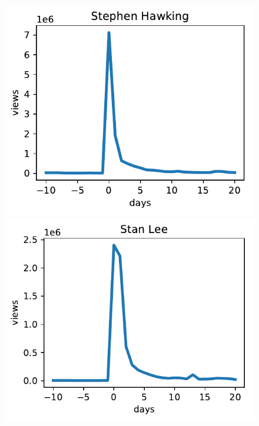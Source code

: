 \documentclass[conference]{IEEEtran}
\begin{document}
\begin{figure}[!htb] \label{views}
  \includegraphics[width=\linewidth]{viewsSH.pdf}
\endminipage\hfill
{}
  \includegraphics[width=\linewidth]{viewsSL.pdf}
\endminipage\hfill
{}%

\end{figure}
\end{document}
